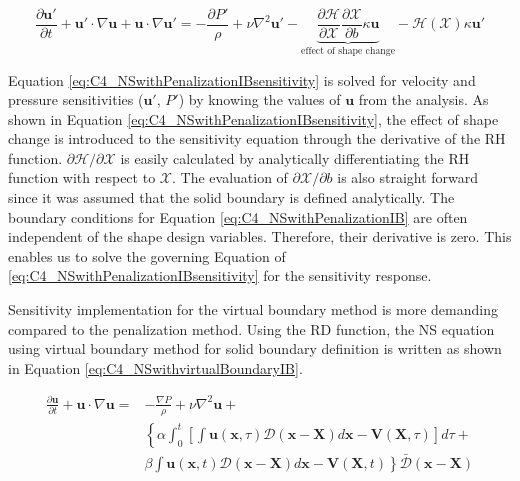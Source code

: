 \begin{equation}\label{eq:C4_NSwithPenalizationIBsensitivity}
    \frac{\partial \mathbf{u}'}{\partial t} +
    \mathbf{u}' \cdot \nabla \mathbf{u} + \mathbf{u} \cdot \nabla \mathbf{u}' = 
    -\frac{\partial P'}{\rho} + 
    \nu \nabla^2 \mathbf{u}' - 
    \underbrace{\frac{\partial \mathcal{H}}{\partial \mathcal{X}} \frac{\partial \mathcal{X}}{\partial b} \kappa \mathbf{u}}_\text{effect of shape change} - 
    \mathcal{H}(\mathcal{X}) \kappa \mathbf{u}'
\end{equation}

Equation \eqref{eq:C4_NSwithPenalizationIBsensitivity} is solved for velocity and pressure sensitivities ($\mathbf{u}'$, $P'$) by knowing the values of $\mathbf{u}$ from the analysis. As shown in Equation \eqref{eq:C4_NSwithPenalizationIBsensitivity}, the effect of shape change is introduced to the sensitivity equation through the derivative of the RH function. $\partial \mathcal{H}/\partial \mathcal{X}$ is easily calculated by analytically differentiating the RH function with respect to $\mathcal{X}$. The evaluation of $\partial \mathcal{X}/\partial b$ is also straight forward since it was assumed that the solid boundary is defined analytically. The boundary conditions for Equation \eqref{eq:C4_NSwithPenalizationIB} are often independent of the shape design variables. Therefore, their derivative is zero. This enables us to solve the governing Equation of \eqref{eq:C4_NSwithPenalizationIBsensitivity} for the sensitivity response.

Sensitivity implementation for the virtual boundary method is more demanding compared to the penalization method. Using the RD function, the NS equation using virtual boundary method for solid boundary definition is written as shown in Equation \eqref{eq:C4_NSwithvirtualBoundaryIB}.

\begin{align}\label{eq:C4_NSwithvirtualBoundaryIB}
    \frac{\partial \mathbf{u}}{\partial t} + 
    \mathbf{u} \cdot \nabla \mathbf{u} = 
    &-\frac{\nabla P}{\rho} + 
    \nu \nabla^2 \mathbf{u} + \nonumber \\
    &\left\{
    \alpha
    \int_0^t
    \left[
        \int \mathbf{u}(\mathbf{x}, \tau) \mathcal{D}(\mathbf{x} - \mathbf{X}) d\mathbf{x} - \mathbf{V}(\mathbf{X}, \tau)
    \right] d\tau \right.
    + \nonumber \\
    &
    \left.
    \beta
    \int \mathbf{u}(\mathbf{x}, t) \mathcal{D}(\mathbf{x} - \mathbf{X}) d\mathbf{x} - \mathbf{V}(\mathbf{X}, t)
    \right\} \bar{\mathcal{D}}(\mathbf{x} - \mathbf{X})
\end{align}

